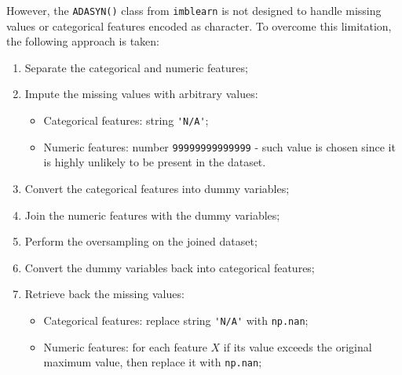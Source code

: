 However, the \lstinline{ADASYN()} class from \lstinline{imblearn} is not designed to handle missing values or categorical features encoded as character. To overcome this limitation, the following approach is taken:
\begin{enumerate}\setlength\itemsep{0em} 
\item Separate the categorical and numeric features;
\item Impute the missing values with arbitrary values:
\begin{itemize}
\item Categorical features: string \lstinline{'N/A'};
\item Numeric features: number \lstinline{99999999999999} - such value is chosen since it is highly unlikely to be present in the dataset.
\end{itemize}
\item Convert the categorical features into dummy variables;
\item Join the numeric features with the dummy variables;
\item Perform the oversampling on the joined dataset;
\item Convert the dummy variables back into categorical features;
\item Retrieve back the missing values:
\begin{itemize}
\item Categorical features: replace string \lstinline{'N/A'} with \lstinline{np.nan};
\item Numeric features: for each feature $X$ if its value exceeds the original maximum value, then replace it with \lstinline{np.nan};
\end{itemize}
\end{enumerate}


